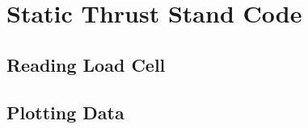 \clearpage
\chapter{Static Thrust Stand Code}
\label{app:sts-code}

\section{Reading Load Cell}
\lstset{style=mystyle}


\clearpage
\section{Plotting Data}
\lstset{style=mystyle}

